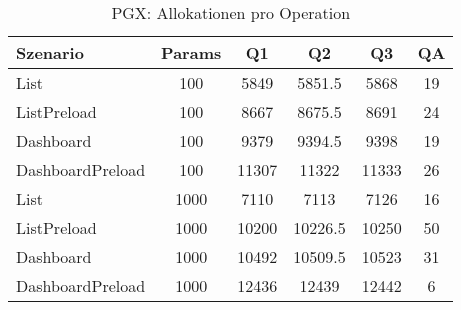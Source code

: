 \begin{table}[ht]
\centering
\caption{PGX: Allokationen pro Operation}
\begin{tabular}{lccccc}
\toprule
Szenario & Params & Q1 & Q2 & Q3 & QA \\
\midrule
	List & 100 & 5849 & 5851.5 & 5868 & 19 \\
	ListPreload & 100 & 8667 & 8675.5 & 8691 & 24 \\
	Dashboard & 100 & 9379 & 9394.5 & 9398 & 19 \\
	DashboardPreload & 100 & 11307 & 11322 & 11333 & 26 \\
	List & 1000 & 7110 & 7113 & 7126 & 16 \\
	ListPreload & 1000 & 10200 & 10226.5 & 10250 & 50 \\
	Dashboard & 1000 & 10492 & 10509.5 & 10523 & 31 \\
	DashboardPreload & 1000 & 12436 & 12439 & 12442 & 6 \\
\bottomrule
\end{tabular}
\label{tab:benchmark_pgx_allocsperop}
\end{table}
	